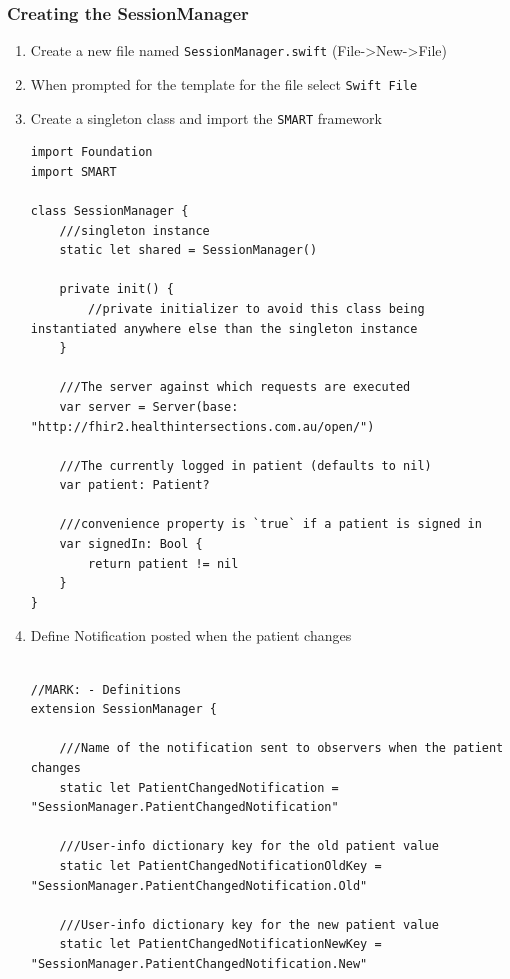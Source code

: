 \documentclass{article}
\begin{document}
\subsubsection{Creating the SessionManager}
\begin{enumerate}
\def\labelenumi{\arabic{enumi}.}
\item
  Create a new file named \texttt{SessionManager.swift}
  (File-\textgreater{}New-\textgreater{}File)
\item
  When prompted for the template for the file select
  \texttt{Swift\ File}
\item
  Create a singleton class and import the \texttt{SMART} framework

\begin{verbatim}
import Foundation
import SMART

class SessionManager {
    ///singleton instance
    static let shared = SessionManager()

    private init() {
        //private initializer to avoid this class being instantiated anywhere else than the singleton instance
    }

    ///The server against which requests are executed
    var server = Server(base: "http://fhir2.healthintersections.com.au/open/")

    ///The currently logged in patient (defaults to nil)
    var patient: Patient?

    ///convenience property is `true` if a patient is signed in
    var signedIn: Bool {
        return patient != nil
    }
}
\end{verbatim}

\item
Define Notification posted when the patient changes

\begin{verbatim}

//MARK: - Definitions
extension SessionManager {

    ///Name of the notification sent to observers when the patient changes
    static let PatientChangedNotification = "SessionManager.PatientChangedNotification"

    ///User-info dictionary key for the old patient value
    static let PatientChangedNotificationOldKey = "SessionManager.PatientChangedNotification.Old"

    ///User-info dictionary key for the new patient value
    static let PatientChangedNotificationNewKey = "SessionManager.PatientChangedNotification.New"


\end{verbatim}
\end{enumerate}
\end{document}
